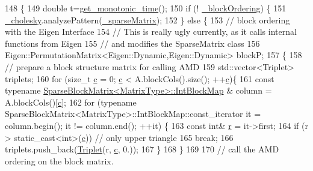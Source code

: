 \begin{DoxyCode}
148     \{
149       \textcolor{keywordtype}{double} t=\hyperlink{namespaceg2o_aa64237935c7d8411b4369234a5f661ea}{get\_monotonic\_time}();
150       \textcolor{keywordflow}{if} (! \hyperlink{classg2o_1_1LinearSolverEigen_a041970f37a5a6e63778f0c40e7c6e948}{\_blockOrdering}) \{
151         \hyperlink{classg2o_1_1LinearSolverEigen_ab7205de4c6820b3ecd7ed7f39bbdf573}{\_cholesky}.analyzePattern(\hyperlink{classg2o_1_1LinearSolverEigen_a39682995a9cf32dc79848281c6d4d9b9}{\_sparseMatrix});
152       \} \textcolor{keywordflow}{else} \{
153         \textcolor{comment}{// block ordering with the Eigen Interface}
154         \textcolor{comment}{// This is really ugly currently, as it calls internal functions from Eigen}
155         \textcolor{comment}{// and modifies the SparseMatrix class}
156         Eigen::PermutationMatrix<Eigen::Dynamic,Eigen::Dynamic> blockP;
157         \{
158           \textcolor{comment}{// prepare a block structure matrix for calling AMD}
159           std::vector<Triplet> triplets;
160           \textcolor{keywordflow}{for} (\textcolor{keywordtype}{size\_t} \hyperlink{sparse__block__matrix_8hpp_a4e1e0e72dd773439e333c84dd762a9c3}{c} = 0; \hyperlink{sparse__block__matrix_8hpp_a4e1e0e72dd773439e333c84dd762a9c3}{c} < A.blockCols().size(); ++\hyperlink{sparse__block__matrix_8hpp_a4e1e0e72dd773439e333c84dd762a9c3}{c})\{
161             \textcolor{keyword}{const} \textcolor{keyword}{typename} \hyperlink{classg2o_1_1SparseBlockMatrix_aaa6ca1ae454ed70f62992b6401645f4e}{SparseBlockMatrix<MatrixType>::IntBlockMap}
      & column = A.blockCols()[\hyperlink{sparse__block__matrix_8hpp_a4e1e0e72dd773439e333c84dd762a9c3}{c}];
162             \textcolor{keywordflow}{for} (\textcolor{keyword}{typename} SparseBlockMatrix<MatrixType>::IntBlockMap::const\_iterator it = column.begin(); 
      it != column.end(); ++it) \{
163               \textcolor{keyword}{const} \textcolor{keywordtype}{int}& \hyperlink{sparse__block__matrix_8hpp_acab531abaa74a7e664e3986f2522b33a}{r} = it->first;
164               \textcolor{keywordflow}{if} (r > static\_cast<int>(\hyperlink{sparse__block__matrix_8hpp_a4e1e0e72dd773439e333c84dd762a9c3}{c})) \textcolor{comment}{// only upper triangle}
165                 \textcolor{keywordflow}{break};
166               triplets.push\_back(\hyperlink{classg2o_1_1LinearSolverEigen_a602c24e05d2f46022aa1827fdbc45638}{Triplet}(r, \hyperlink{sparse__block__matrix_8hpp_a4e1e0e72dd773439e333c84dd762a9c3}{c}, 0.));
167             \}
168           \}
169 
170           \textcolor{comment}{// call the AMD ordering on the block matrix.}

\end{DoxyCode}
